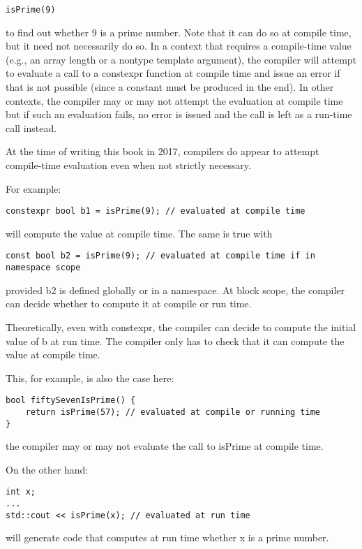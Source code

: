 \begin{lstlisting}[style=styleCXX]
isPrime(9)
\end{lstlisting}

\noindent
to find out whether 9 is a prime number. Note that it can do so at compile time, but it need not necessarily do so. In a context that requires a compile-time value (e.g., an array length or a nontype template argument), the compiler will attempt to evaluate a call to a constexpr function at compile time and issue an error if that is not possible (since a constant must be produced in the end). In other contexts, the compiler may or may not attempt the evaluation at compile time but if such an evaluation fails, no error is issued and the call is left as a run-time call instead.

\begin{tcolorbox}[colback=webgreen!5!white,colframe=webgreen!75!black]
\hspace*{0.75cm}At the time of writing this book in 2017, compilers do appear to attempt compile-time evaluation even when not strictly necessary.
\end{tcolorbox}

For example:

\begin{lstlisting}[style=styleCXX]
constexpr bool b1 = isPrime(9); // evaluated at compile time
\end{lstlisting}

will compute the value at compile time. The same is true with

\begin{lstlisting}[style=styleCXX]
const bool b2 = isPrime(9); // evaluated at compile time if in namespace scope
\end{lstlisting}

\noindent
provided b2 is defined globally or in a namespace. At block scope, the compiler can decide whether to compute it at compile or run time.

\begin{tcolorbox}[colback=webgreen!5!white,colframe=webgreen!75!black]
\hspace*{0.75cm}Theoretically, even with constexpr, the compiler can decide to compute the initial value of b at run time. The compiler only has to check that it can compute the value at compile time.
\end{tcolorbox}

This, for example, is also the case here:

\begin{lstlisting}[style=styleCXX]
bool fiftySevenIsPrime() {
	return isPrime(57); // evaluated at compile or running time
}
\end{lstlisting}

\noindent
the compiler may or may not evaluate the call to isPrime at compile time.

On the other hand:

\begin{lstlisting}[style=styleCXX]
int x;
...
std::cout << isPrime(x); // evaluated at run time
\end{lstlisting}

\noindent
will generate code that computes at run time whether x is a prime number.

